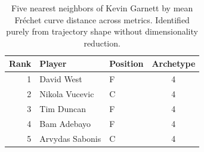 \begin{table}[htbp]
  \centering\small
  \begin{tabular}{rllc}
    \toprule
    Rank & Player & Position & Archetype \\
    \midrule
    1 & David West & F & 4 \\
    2 & Nikola Vucevic & C & 4 \\
    3 & Tim Duncan & F & 4 \\
    4 & Bam Adebayo & F & 4 \\
    5 & Arvydas Sabonis & C & 4 \\
    \bottomrule
  \end{tabular}
  \caption{Five nearest neighbors of Kevin Garnett by mean Fr\'{e}chet curve distance across metrics. Identified purely from trajectory shape without dimensionality reduction.}
  \label{tab:Kevin_Garnett_frechet_curve_neighbors}
\end{table}

